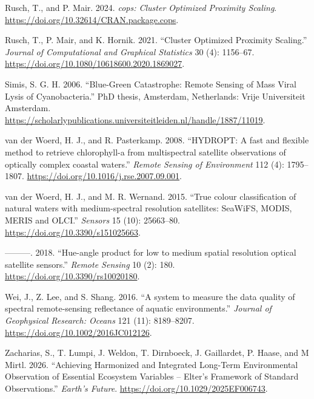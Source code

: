 \documentclass[
]{article}
\newlength{\cslhangindent}
\newenvironment{CSLReferences}[2] %
 {\begin{list}{}{%
  \setlength{\itemindent}{0pt}
  \setlength{\leftmargin}{0pt}
  \setlength{\parsep}{0pt}
  \ifodd #1
   \setlength{\leftmargin}{\cslhangindent}
   \setlength{\itemindent}{-1\cslhangindent}
  \fi
  \setlength{\itemsep}{#2\baselineskip}}}
 {\end{list}}
\begin{document}
\begin{CSLReferences}{1}{0}
Rusch, T., and P. Mair. 2024. \emph{{cops: Cluster Optimized Proximity
Scaling}}. \url{https://doi.org/10.32614/CRAN.package.cops}.

Rusch, T., P. Mair, and K. Hornik. 2021. {``{Cluster Optimized Proximity
Scaling}.''} \emph{Journal of Computational and Graphical Statistics} 30
(4): 1156--67. \url{https://doi.org/10.1080/10618600.2020.1869027}.

Simis, S. G. H. 2006. {``Blue-Green Catastrophe: Remote Sensing of Mass
Viral Lysis of Cyanobacteria.''} PhD thesis, Amsterdam, Netherlands:
Vrije Universiteit Amsterdam.
\url{https://scholarlypublications.universiteitleiden.nl/handle/1887/11019}.

van der Woerd, H. J., and R. Pasterkamp. 2008. {``{HYDROPT: A fast and
flexible method to retrieve chlorophyll-a from multispectral satellite
observations of optically complex coastal waters}.''} \emph{Remote
Sensing of Environment} 112 (4): 1795--1807.
\url{https://doi.org/10.1016/j.rse.2007.09.001}.

van der Woerd, H. J., and M. R. Wernand. 2015. {``{True colour
classification of natural waters with medium-spectral resolution
satellites: SeaWiFS, MODIS, MERIS and OLCI}.''} \emph{Sensors} 15 (10):
25663--80. \url{https://doi.org/10.3390/s151025663}.

---------. 2018. {``{Hue-angle product for low to medium spatial
resolution optical satellite sensors}.''} \emph{Remote Sensing} 10 (2):
180. \url{https://doi.org/10.3390/rs10020180}.

Wei, J., Z. Lee, and S. Shang. 2016. {``{A system to measure the data
quality of spectral remote-sensing reflectance of aquatic
environments}.''} \emph{Journal of Geophysical Research: Oceans} 121
(11): 8189--8207. \url{https://doi.org/10.1002/2016JC012126}.

Zacharias, S., T. Lumpi, J. Weldon, T. Dirnboeck, J. Gaillardet, P.
Haase, and M Mirtl. 2026. {``Achieving Harmonized and Integrated
Long-Term Environmental Observation of Essential Ecosystem Variables --
Elter's Framework of Standard Observations.''} \emph{Earth's Future}.
\url{https://doi.org/10.1029/2025EF006743}.

\end{CSLReferences}
\end{document}

